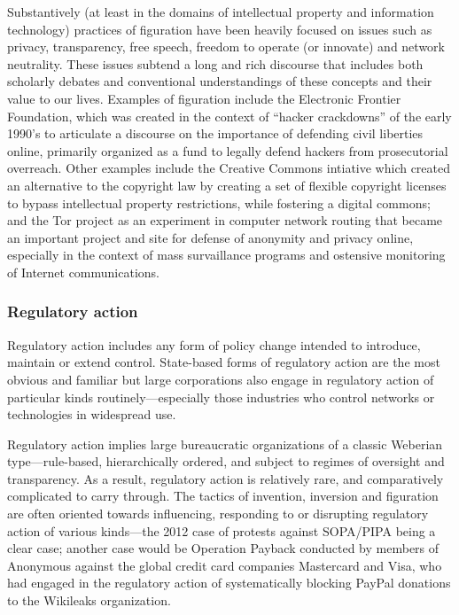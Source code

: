 \documentclass[10pt,letter,oneside]{scrartcl}
\begin{document}
Substantively (at least in the domains of intellectual property and information
technology) practices of figuration have been heavily focused on issues such as
privacy, transparency, free speech, freedom to operate (or innovate) and network
neutrality.   These issues subtend a long and rich discourse that includes both
scholarly debates and conventional understandings of these concepts and their
value to our lives. Examples of figuration include the Electronic Frontier 
Foundation, which was created in the context of ``hacker crackdowns'' of the 
early 1990's to articulate a discourse on the importance of defending civil 
liberties online, primarily organized as a fund to legally defend hackers from prosecutorial overreach. Other examples include the Creative Commons intiative 
which created an alternative to the copyright law by creating a set of flexible 
copyright licenses to bypass intellectual property restrictions, while fostering a 
digital commons; and the Tor project as an experiment in computer network routing 
that became an important project and site for defense of anonymity and privacy online, especially in the context of mass survaillance programs and ostensive monitoring of Internet communications.

\subsubsection{Regulatory action}

Regulatory action includes any form of policy change intended to introduce,
maintain or extend control.  State-based forms of regulatory action are the
most obvious and familiar but large corporations also engage in regulatory
action of particular kinds routinely---especially those industries who control
networks or technologies in widespread use.

Regulatory action implies large bureaucratic organizations of a classic Weberian
type---rule-based, hierarchically ordered, and subject to regimes of oversight
and transparency.  As a result, regulatory action is relatively rare, and
comparatively complicated to carry through.  The tactics of invention, inversion
and figuration are often oriented towards influencing, responding to or
disrupting regulatory action of various kinds---the 2012 case of protests
against SOPA/PIPA being a clear case; another case would be Operation Payback
conducted by members of Anonymous against the global credit card companies
Mastercard and Visa, who had engaged in the regulatory action of systematically
blocking PayPal donations to the Wikileaks organization. 
\end{document}
